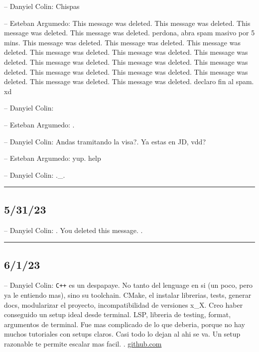 -- Danyiel Colin: Chispas

-- Esteban Argumedo: This message was deleted. This message was deleted.
This message was deleted. This message was deleted. perdona, abra spam
masivo por 5 mins. This message was deleted. This message was deleted.
This message was deleted. This message was deleted. This message was
deleted. This message was deleted. This message was deleted. This
message was deleted. This message was deleted. This message was deleted.
This message was deleted. This message was deleted. This message was
deleted. This message was deleted. declaro fin al spam. xd

-- Danyiel Colin:

-- Esteban Argumedo: .

-- Danyiel Colin: Andas tramitando la visa?. Ya estas en JD, vdd?

-- Esteban Argumedo: yup. help

-- Danyiel Colin: .\_.

\begin{center}\rule{0.5\linewidth}{0.5pt}\end{center}

\hypertarget{section-207}{%
\subsection{5/31/23}\label{section-207}}

-- Danyiel Colin: . You deleted this message. .

\begin{center}\rule{0.5\linewidth}{0.5pt}\end{center}

\hypertarget{section-208}{%
\subsection{6/1/23}\label{section-208}}

-- Danyiel Colin: \texttt{C++} es un despapaye. No tanto del lenguage en
si (un poco, pero ya le entiendo mas), sino su toolchain. CMake, el
instalar librerias, tests, generar docs, modularizar el proyecto,
incompatibilidad de versiones x\_X. Creo haber conseguido un setup ideal
desde terminal. LSP, libreria de testing, format, argumentos de
terminal. Fue mas complicado de lo que deberia, porque no hay muchos
tutoriales con setups claros. Casi todo lo dejan al ahi se va. Un setup
razonable te permite escalar mas facil. .
\href{https://github.com/DanEscher98/Procedural-Notes/tree/main/Cpp-20/basic_layout}{github.com}


